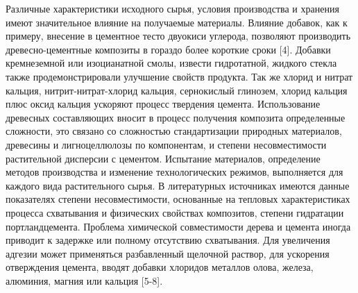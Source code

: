Различные характеристики исходного сырья, условия производства и
хранения имеют значительное влияние на получаемые материалы. Влияние
добавок, как к примеру, внесение в цементное тесто двуокиси углерода,
позволяют производить древесно-цементные композиты в гораздо более
короткие сроки {[}4{]}. Добавки кремнеземной или изоцианатной смолы,
извести гидротатной, жидкого стекла также продемонстрировали улучшение
свойств продукта. Так же хлорид и нитрат кальция, нитрит-нитрат-хлорид
кальция, сернокислый глинозем, хлорид кальция плюс оксид кальция
ускоряют процесс твердения цемента. Использование древесных составляющих
вносит в процесс получения композита определенные сложности, это связано
со сложностью стандартизации природных материалов, древесины и
лигноцеллюлозы по компонентам, и степени несовместимости растительной
дисперсии с цементом. Испытание материалов, определение методов
производства и изменение технологических режимов, выполняется для
каждого вида растительного сырья. В литературных источниках имеются
данные показателях степени несовместимости, основанные на тепловых
характеристиках процесса схватывания и физических свойствах композитов,
степени гидратации портландцемента. Проблема химической совместимости
дерева и цемента иногда приводит к задержке или полному отсутствию
схватывания. Для увеличения адгезии может применяться разбавленный
щелочной раствор, для ускорения отверждения цемента, вводят добавки
хлоридов металлов олова, железа, алюминия, магния или кальция {[}5-8{]}.

